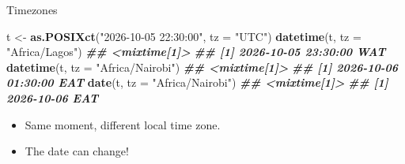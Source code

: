 \documentclass[
  14pt,
  ignorenonframetext,
  aspectratio=169,
]{beamer}
\newenvironment{Shaded}{\begin{snugshade}}{\end{snugshade}}
\newcommand{\AttributeTok}[1]{\textcolor[rgb]{0.13,0.29,0.53}{#1}}
\newcommand{\DocumentationTok}[1]{\textcolor[rgb]{0.56,0.35,0.01}{\textbf{\textit{#1}}}}
\newcommand{\FunctionTok}[1]{\textcolor[rgb]{0.13,0.29,0.53}{\textbf{#1}}}
\newcommand{\NormalTok}[1]{#1}
\newcommand{\OtherTok}[1]{\textcolor[rgb]{0.56,0.35,0.01}{#1}}
\newcommand{\StringTok}[1]{\textcolor[rgb]{0.31,0.60,0.02}{#1}}
\providecommand{\tightlist}{%
  \setlength{\itemsep}{0pt}\setlength{\parskip}{0pt}}
\renewenvironment{Shaded}{\vspace*{0.15cm}\color{black}\fontsize{10}{10}\sf\begin{snugshade}\color{black}}{\end{snugshade}}
\begin{document}
\begin{frame}[fragile]{Timezones}
\protect{}\label{timezones}
\fontsize{11}{12}\sf

\begin{Shaded}
\begin{Highlighting}[]
\NormalTok{t }\OtherTok{\textless{}{-}} \FunctionTok{as.POSIXct}\NormalTok{(}\StringTok{"2026{-}10{-}05 22:30:00"}\NormalTok{, }\AttributeTok{tz =} \StringTok{"UTC"}\NormalTok{)}
\FunctionTok{datetime}\NormalTok{(t, }\AttributeTok{tz =} \StringTok{"Africa/Lagos"}\NormalTok{)}
\DocumentationTok{\#\# \textless{}mixtime[1]\textgreater{}}
\DocumentationTok{\#\# [1] 2026{-}10{-}05 23:30:00 WAT}
\FunctionTok{datetime}\NormalTok{(t, }\AttributeTok{tz =} \StringTok{"Africa/Nairobi"}\NormalTok{)}
\DocumentationTok{\#\# \textless{}mixtime[1]\textgreater{}}
\DocumentationTok{\#\# [1] 2026{-}10{-}06 01:30:00 EAT}
\FunctionTok{date}\NormalTok{(t, }\AttributeTok{tz =} \StringTok{"Africa/Nairobi"}\NormalTok{)}
\DocumentationTok{\#\# \textless{}mixtime[1]\textgreater{}}
\DocumentationTok{\#\# [1] 2026{-}10{-}06 EAT}
\end{Highlighting}
\end{Shaded}

\pause

\begin{itemize}
\tightlist
\item
  Same moment, different local time zone.
\item
  The date can change!
\end{itemize}
\end{frame}
\end{document}
